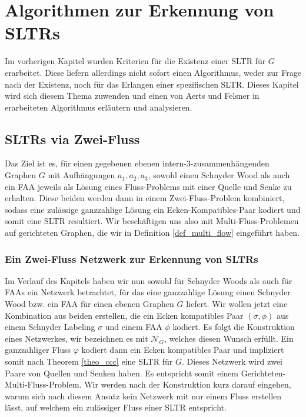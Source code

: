\chapter{Algorithmen zur Erkennung von SLTRs}\label{main_algo}

Im vorherigen Kapitel wurden Kriterien für die Existenz einer SLTR für $G$ erarbeitet. Diese liefern allerdings nicht sofort einen Algorithmus, weder zur Frage nach der Existenz, noch für das Erlangen einer spezifischen SLTR. Dieses Kapitel wird sich diesem Thema zuwenden und einen von Aerts und Felsner in \cite{af15} erarbeiteten Algorithmus erläutern und analysieren.

\section{SLTRs via Zwei-Fluss}

Das Ziel ist es, für einen gegebenen ebenen intern-3-zusammenhängenden Graphen $G$ mit Aufhängungen $a_1,a_2,a_3$, sowohl einen Schnyder Wood als auch ein FAA jeweils als Lösung eines Fluss-Problems mit einer Quelle und Senke zu erhalten. Diese beiden werden dann in einem Zwei-Fluss-Problem kombiniert, sodass eine zulässige ganzzahlige Lösung ein Ecken-Kompatibles-Paar kodiert und somit eine SLTR resultiert. Wir beschäftigen uns also mit Multi-Fluss-Problemen auf gerichteten Graphen, die wir in Definition \ref{def_multi_flow} eingeführt haben.



\subsection{Ein Zwei-Fluss Netzwerk zur Erkennung von SLTRs}

Im Verlauf des Kapitels haben wir nun sowohl für Schnyder Woods als auch für FAAs ein Netzwerk betrachtet, für das eine ganzzahlige Lösung einen Schnyder Wood bzw. ein FAA für einen ebenen Graphen $G$ liefert. Wir wollen jetzt eine Kombination aus beiden erstellen, die ein Ecken kompatibles Paar $(\sigma,\phi)$ aus einem Schnyder Labeling $\sigma$ und einem FAA $\phi$  kodiert. Es folgt die Konstruktion eines Netzwerkes, wir bezeichnen es mit $\mathcal{N}_G$, welches diesen Wunsch erfüllt. Ein ganzzahliger Fluss $\varphi$ kodiert dann ein Ecken kompatibles Paar und impliziert somit nach Theorem \ref{theo_ccc} eine SLTR für $G$. Dieses Netzwerk wird zwei Paare von Quellen und Senken haben. Es entspricht somit einem Gerichteten-Multi-Fluss-Problem. Wir werden nach der Konstruktion kurz darauf eingehen, warum sich nach diesem Ansatz kein Netzwerk mit nur einem Fluss erstellen lässt, auf welchem ein zulässiger Fluss einer SLTR entspricht.

